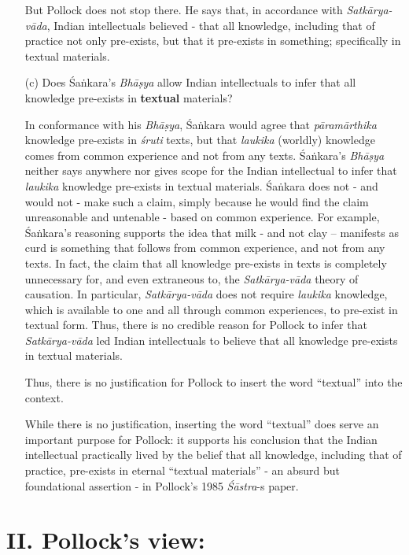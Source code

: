 \begin{itemize}
But Pollock does not stop there.  He says that, in accordance with {\sl Satkārya-vāda}, Indian intellectuals believed - that all knowledge, including that of practice not only pre-exists, but that it pre-exists in something; specifically in textual materials.

\item[(c)] Does Śaṅkara's {\sl Bhāṣya} allow Indian intellectuals to infer that all knowledge pre-exists  in {\bf textual} materials?

In conformance with his {\sl Bhāṣya}, Śaṅkara would agree that {\sl pāramārthika} knowledge pre-exists in {\sl śruti} texts, but that {\sl laukika} (worldly) knowledge comes from common experience and not from any texts. Śaṅ\-kara's {\sl Bhāṣya} neither says anywhere nor gives scope for the Indian intellectual to infer that {\sl laukika} knowledge pre-exists in textual materials.  Śaṅkara does not - and would not - make such a claim, simply because he would find the claim unreasonable and untenable - based on common experience. For example, Śaṅkara's reasoning supports the idea that milk - and not clay -- manifests as curd is something that follows from common experience, and not from any texts. In fact, the claim that all knowledge pre-exists in texts is completely unnecessary for, and even extraneous to, the {\sl Satkārya-vāda} theory of causation. In particular, {\sl Satkārya-vāda} does not require {\sl laukika} knowledge, which is available to one and all through common experiences, to pre-exist in textual form. Thus, there is no credible reason for Pollock to infer that {\sl Satkārya-vāda} led Indian intellectuals to believe that all knowledge pre-exists in textual materials.

Thus, there is no justification for Pollock to insert the word ``textual'' into the context.

While there is no justification, inserting the word ``textual'' does serve an important purpose for Pollock: it supports his conclusion that the Indian intellectual practically lived by the belief that all knowledge, including that of practice, pre-exists in eternal ``textual materials'' - an absurd but foundational assertion - in Pollock's 1985 {\sl Śāstra}-s paper.
\end{itemize}

\section*{II. Pollock's view:}

